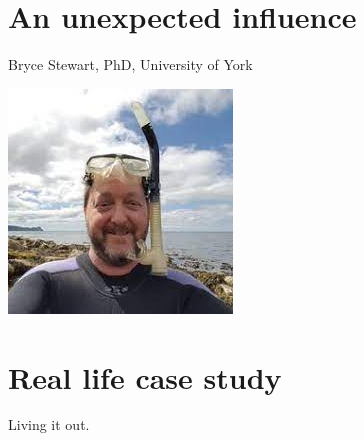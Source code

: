 \documentclass[
]{book}
\begin{document}
\hypertarget{an-unexpected-influence}{%
\chapter{An unexpected influence}\label{an-unexpected-influence}}

Bryce Stewart, PhD, University of York

\begin{center}\includegraphics[width=1\linewidth]{_images/bryce} \end{center}

\hypertarget{real-life-case-study}{%
\chapter{Real life case study}\label{real-life-case-study}}

Living it out.
\end{document}
